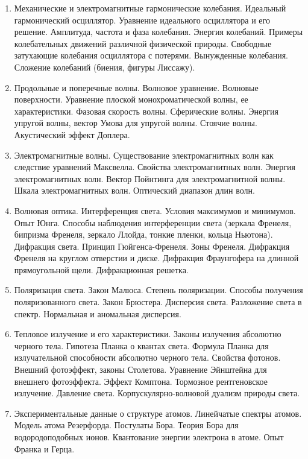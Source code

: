 \begin{enumerate}
    \item Механические и электромагнитные гармонические колебания. Идеальный гармонический 
    осциллятор. Уравнение идеального осциллятора и его решение. Амплитуда, частота и фаза 
    колебания. Энергия колебаний. Примеры колебательных движений различной физической 
    природы. Свободные затухающие колебания осциллятора с потерями. Вынужденные колебания. 
    Сложение колебаний (биения, фигуры Лиссажу). 

    \item Продольные и поперечные волны. Волновое уравнение. Волновые поверхности. Уравнение 
    плоской монохроматической волны, ее характеристики. Фазовая скорость волны. Сферические 
    волны. Энергия упругой волны, вектор Умова для упругой волны. Стоячие волны. Акустический 
    эффект Доплера. 

    \item Электромагнитные волны. Существование электромагнитных волн как следствие уравнений 
    Максвелла. Свойства электромагнитных волн. Энергия электромагнитных волн. Вектор 
    Пойнтинга для электромагнитной волны. Шкала электромагнитных волн. Оптический диапазон 
    длин волн. 

    \item Волновая оптика. Интерференция света. Условия максимумов и минимумов. Опыт Юнга. 
    Способы наблюдения интерференции света (зеркала Френеля, бипризма Френеля, зеркало 
    Ллойда, тонкие пленки, кольца Ньютона). Дифракция света. Принцип Гюйгенса-Френеля. Зоны 
    Френеля. Дифракция Френеля на круглом отверстии и диске. Дифракция Фраунгофера на 
    длинной прямоугольной щели. Дифракционная решетка. 
    
    \item Поляризация света. Закон Малюса. Степень поляризации. Способы получения 
    поляризованного света. Закон Брюстера. Дисперсия света. Разложение света в спектр. 
    Нормальная и аномальная дисперсия.

    \item Тепловое излучение и его характеристики. Законы излучения абсолютно черного тела. 
    Гипотеза Планка о квантах света. Формула Планка для излучательной способности абсолютно 
    черного тела. Свойства фотонов. Внешний фотоэффект, законы Столетова. Уравнение 
    Эйнштейна для внешнего фотоэффекта. Эффект Комптона. Тормозное рентгеновское излучение. 
    Давление света. Корпускулярно-волновой дуализм природы света.

    \item Экспериментальные данные о структуре атомов. Линейчатые спектры атомов. Модель атома 
    Резерфорда. Постулаты Бора. Теория Бора для водородоподобных ионов. Квантование энергии 
    электрона в атоме. Опыт Франка и Герца. 


\end{enumerate}

